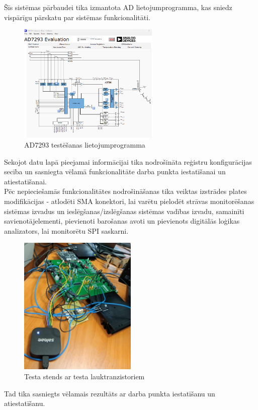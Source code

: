 Šīs sistēmas pārbaudei tika izmantota AD lietojumprogramma, kas sniedz vispārīgu pārskatu par sistēmas funkcionalitāti.
\begin{figure}[H]
	\centering
    \includegraphics[width=0.6\textwidth]{pictures/eval-soft.png}\hspace{1cm}
    \caption{AD7293 testēšanas lietojumprogramma}
\end{figure}
Sekojot datu lapā pieejamai informācijai tika nodrošināta reģistru konfigurācijas secība un sasniegta vēlamā funkcionalitāte darba punkta iestatīšanai un atiestatīšanai.\\
Pēc nepieciešamās funkcionalitātes nodrošināšanas tika veiktas izstrādes plates modifikācijas - atlodēti SMA konektori, lai varētu pielodēt strāvas monitorēšanas sistēmas izvadus un ieslēgšanas/izslēgšanas sistēmas vadības izvadu, samainīti savienotājelementi, pievienoti barošanas avoti un pievienots digitālās loģikas analizators, lai monitorētu SPI saskarni.
\begin{figure}[H]
	\centering
    \includegraphics[width=0.5\textwidth]{pictures/daf.jpg}\hspace{1cm}
    \caption{Testa stends ar testa lauktranzistoriem}
\end{figure}
Tad tika sasniegts vēlamais rezultāts ar darba punkta iestatīšanu un atiestatīšanu.
